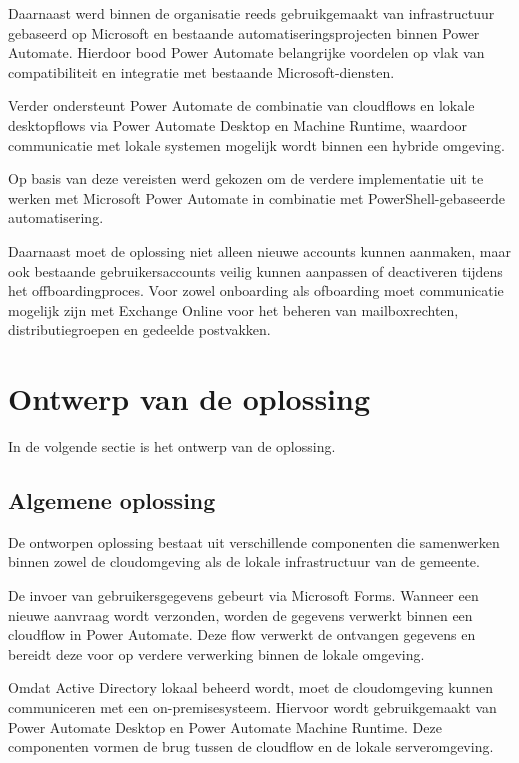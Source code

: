 Daarnaast werd binnen de organisatie reeds gebruikgemaakt van infrastructuur gebaseerd op Microsoft en bestaande automatiseringsprojecten binnen Power Automate. Hierdoor bood Power Automate belangrijke voordelen op vlak van compatibiliteit en integratie met bestaande Microsoft-diensten.

Verder ondersteunt Power Automate de combinatie van cloudflows en lokale desk\-top\-flows via Power Automate Desktop en Machine Runtime, waardoor communicatie met lokale systemen mogelijk wordt binnen een hybride omgeving.

Op basis van deze vereisten werd gekozen om de verdere implementatie uit te werken met Microsoft Power Automate in combinatie met PowerShell-gebaseerde automatisering.

Daarnaast moet de oplossing niet alleen nieuwe accounts kunnen aanmaken, maar ook bestaande gebruikersaccounts veilig kunnen aanpassen of deactiveren tijdens het offboardingproces. Voor zowel onboarding als ofboarding moet communicatie mogelijk zijn met Exchange Online voor het beheren van mailboxrechten, distributiegroepen en gedeelde postvakken.

\section{Ontwerp van de oplossing}

In de volgende sectie is het ontwerp van de oplossing. 

\subsection{Algemene oplossing}

De ontworpen oplossing bestaat uit verschillende componenten die samenwerken binnen zowel de cloudomgeving als de lokale infrastructuur van de gemeente.

De invoer van gebruikersgegevens gebeurt via Microsoft Forms. Wanneer een nieu\-we aanvraag wordt verzonden, worden de gegevens verwerkt binnen een cloudflow in Power Automate. Deze flow verwerkt de ontvangen gegevens en bereidt deze voor op verdere verwerking binnen de lokale omgeving.

Omdat Active Directory lokaal beheerd wordt, moet de cloudomgeving kunnen communiceren met een on-premisesysteem. Hiervoor wordt gebruikgemaakt van Power Automate Desktop en Power Automate Machine Runtime. Deze componenten vormen de brug tussen de cloudflow en de lokale serveromgeving.

